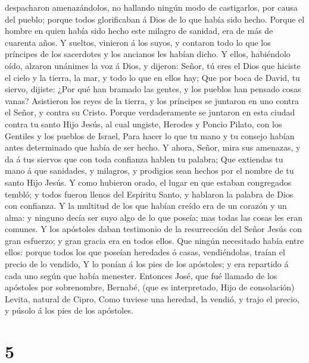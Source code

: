 despacharon amenazándolos, no hallando ningún modo de castigarlos, por
causa del pueblo; porque todos glorificaban á Dios de lo que había sido
hecho.  Porque el hombre en quien había sido hecho este
milagro de sanidad, era de más de cuarenta años.  Y
sueltos, vinieron á los suyos, y contaron todo lo que los príncipes de
los sacerdotes y los ancianos les habían dicho.  Y ellos,
habiéndolo oído, alzaron unánimes la voz á Dios, y dijeron: Señor, tú
eres el Dios que hiciste el cielo y la tierra, la mar, y todo lo que en
ellos hay;  Que por boca de David, tu siervo, dijiste:
¿Por qué han bramado las gentes, y los pueblos han pensado cosas vanas?
 Asistieron los reyes de la tierra, y los príncipes se
juntaron en uno contra el Señor, y contra su Cristo. 
Porque verdaderamente se juntaron en esta ciudad contra tu santo Hijo
Jesús, al cual ungiste, Herodes y Poncio Pilato, con los Gentiles y los
pueblos de Israel,  Para hacer lo que tu mano y tu
consejo habían antes determinado que había de ser hecho. 
Y ahora, Señor, mira sus amenazas, y da á tus siervos que con toda
confianza hablen tu palabra;  Que extiendas tu mano á que
sanidades, y milagros, y prodigios sean hechos por el nombre de tu santo
Hijo Jesús.  Y como hubieron orado, el lugar en que
estaban congregados tembló; y todos fueron llenos del Espíritu Santo, y
hablaron la palabra de Dios con confianza.  Y la multitud
de los que habían creído era de un corazón y un alma: y ninguno decía
ser suyo algo de lo que poseía; mas todas las cosas les eran comunes.
 Y los apóstoles daban testimonio de la resurrección del
Señor Jesús con gran esfuerzo; y gran gracia era en todos ellos.
 Que ningún necesitado había entre ellos: porque todos
los que poseían heredades ó casas, vendiéndolas, traían el precio de lo
vendido,  Y lo ponían á los pies de los apóstoles; y era
repartido á cada uno según que había menester.  Entonces
José, que fué llamado de los apóstoles por sobrenombre, Bernabé, (que es
interpretado, Hijo de consolación) Levita, natural de Cipro,
 Como tuviese una heredad, la vendió, y trajo el precio,
y púsolo á los pies de los apóstoles.

\hypertarget{section-4}{%
\section{5}\label{section-4}}

